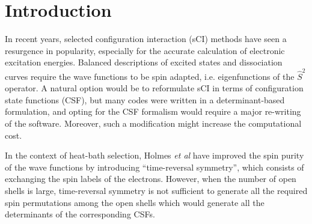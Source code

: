 \documentclass[aip,jcp,reprint,showkeys]{revtex4-1}
\newcommand{\stwo}{\hat{S}^2}
\newcommand{\csf}{CSF}
\newcommand{\sci}{sCI}
\begin{document}
\section{Introduction}

In recent years, selected configuration interaction ({\sci}) methods have seen a resurgence in
popularity,\cite{Greer_1998,Stampfuss_2005,Bytautas_2009,Booth_2009,Giner_2013,Buenker_2014,Holmes_2016,Ohtsuka_2017,Coe_2018,Scemama_2018a}
especially for the accurate calculation of electronic excitation
energies.\cite{Coe_2013,Schriber_2017,Holmes_2017,Loos_2018,Scemama_2018,Dash_2018,Chien_2018,Loos_2018a}
Balanced descriptions of excited states and dissociation curves require
the wave functions to be spin adapted, i.e. eigenfunctions of the $\stwo$
operator. A natural option would be to reformulate {\sci} in terms of
configuration state functions ({\csf}), but many codes were written in a
determinant-based formulation, and opting for the {\csf} formalism would require
a major re-writing of the software. Moreover, such a modification might
increase the computational cost.\cite{Knowles_1984,Olsen_1988}

In the context of heat-bath selection, Holmes \textit{et al} have 
improved the spin purity of the wave functions by introducing ``time-reversal
symmetry'', \cite{Holmes_2017} which consists of exchanging the spin labels of
the electrons.
However, when the number of open shells is large, time-reversal symmetry is not
sufficient to generate all the required spin permutations among the open shells
which would generate all the determinants of the corresponding {\csf s}.
\end{document}

